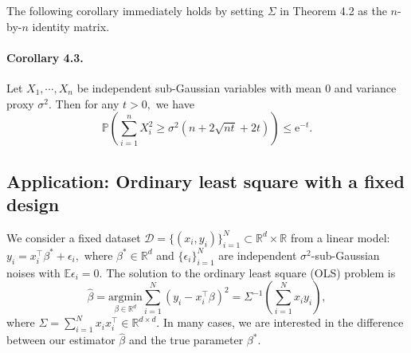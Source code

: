 \documentclass{article}
\newcommand{\E}{\mathbb{E}}
\begin{document}
The following corollary immediately holds by setting $\Sigma$ in Theorem 4.2 as the $n$-by-$n$ identity matrix.
\paragraph{Corollary 4.3.} Let $X_1,\cdots,X_n$ be independent sub-Gaussian variables with mean 0 and variance proxy $\sigma^2.$ Then for any $t > 0,$ we have
\begin{equation*}
	\mathbb{P}\left(\sum_{i=1}^n X_i^2\geq \sigma^2\left(n + 2\sqrt{nt} + 2t\right)\right)\leq\mathrm{e}^{-t}.\tag{4.14}
\end{equation*}

\subsection{Application: Ordinary least square with a fixed design}
We consider a fixed dataset $\mathcal{D}=\{(x_i,y_i)\}_{i=1}^N\subset\mathbb{R}^d\times\mathbb{R}$ from a linear model: $y_i=x_i^\top\beta^* +\epsilon_i,$ where $\beta^*\in\mathbb{R}^d$ and $\{\epsilon_i\}_{i=1}^N$ are independent $\sigma^2$-sub-Gaussian noises with $\E\epsilon_i = 0.$ The solution to the ordinary least square (OLS) problem is
\begin{equation*}
	\widehat{\beta} = \underset{\beta\in\mathbb{R}^d}{\mathrm{argmin}}\sum_{i=1}^N(y_i - x_i^\top\beta)^2 = \Sigma^{-1}\left(\sum_{i=1}^N x_iy_i\right),\tag{4.15}
\end{equation*}
where $\Sigma = \sum_{i=1}^N x_ix_i^\top\in\mathbb{R}^{d\times d}.$ In many cases, we are interested in the difference between our estimator $\widehat{\beta}$ and the true parameter $\beta^*$.
\end{document}
